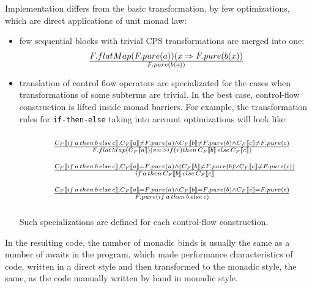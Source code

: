 \documentclass{llncs}
\begin{document}
Implementation differs from the basic transformation, by few optimizations, which are direct applications of unit monad law: 
\begin{itemize}
\item few sequential blocks with trivial CPS transformations are merged into one:
$$
    {F.flatMap(F.pure(a))(x \Rightarrow F.pure(b(x))} \over { F.pure(b(a)) }
$$
 \item translation of control flow operators are specializated for the cases when transformations of some subterms are trivial. In the best case, control-flow construction is lifted inside monad barriers.   For example, the transformation rules for \lstinline|if-then-else| taking into account optimizations will look like:
$$
\begin{array}{ l l }\\
   \,\,\,\,\,\, & \frac
                  { C_F \llbracket  if\,a\,then\,b\,else\,c \rrbracket  , 
                        C_F \llbracket  a \rrbracket  \ne F.pure(a) \land C_F \llbracket  b \rrbracket  \ne F.pure(b) \land 
                        C_F \llbracket  c \rrbracket  \ne F.pure(c) } 
                  { F.flatMap(C_F \llbracket  a \rrbracket  )(v => if (v) then\, C_F \llbracket  b\rrbracket \, else\, C_F \llbracket c \rrbracket ) } \\
   \\
   \,\,\,\,\,\, & \frac
                   { C_F \llbracket  if\,a\,then\,b\,else\,c \rrbracket , 
                     C_F \llbracket  a \rrbracket  = F.pure(a) \land 
                        (C_F \llbracket b \rrbracket  \ne F.pure(b) \lor C_F \llbracket  c \rrbracket  \ne F.pure(c)) } 
                  { if\,a\,then\,C_F \llbracket  b \rrbracket \,else\,C_F \llbracket  c \rrbracket  } \\
   \\
   \,\,\,\,\,\, & \frac 
                  { C_F \llbracket if\,a\,then\,b\,else\,c \rrbracket , 
                      C_F \llbracket  a \rrbracket  = F.pure(a) 
                      \land C_F \llbracket  b \rrbracket  = F.pure(b) 
                      \land C_F \llbracket c \rrbracket  = F.pure(c) } 
                  { F.pure(if\, a\, then\, b\, else\, c) } \\
\\
\end{array}
$$
  Such specializations are defined for each control-flow construction. 

 \end{itemize}

 In the resulting code, the number of monadic binds is usually the same as a number of awaits in the program, which made performance characteristics of code, written in a direct style and then transformed to the monadic style,  the same, as the code manually written by hand in monadic style.
\end{document}
